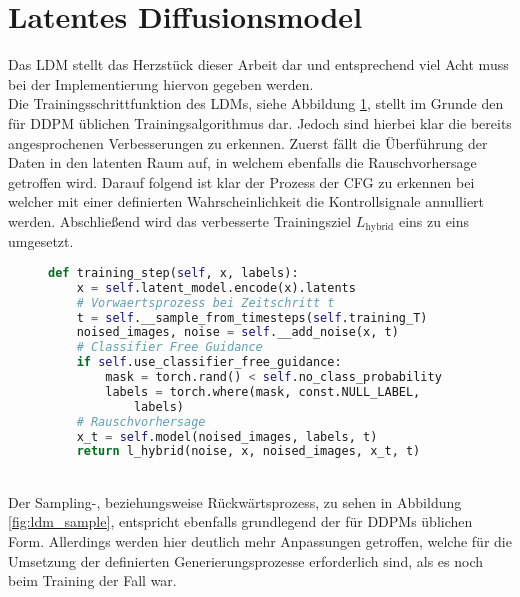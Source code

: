 \section {Latentes Diffusionsmodel}

Das \ac{LDM} stellt das Herzstück dieser Arbeit dar und entsprechend viel Acht muss bei der Implementierung hiervon gegeben werden. \\ 
Die Trainingsschrittfunktion des \ac{LDM}s, siehe Abbildung \ref{fig:ldm_training}, stellt im Grunde den für \ac{DDPM} üblichen Trainingsalgorithmus dar. Jedoch sind hierbei klar die bereits angesprochenen Verbesserungen zu erkennen. Zuerst fällt die Überführung der Daten in den latenten Raum auf, in welchem ebenfalls die Rauschvorhersage getroffen wird. Darauf folgend ist klar der Prozess der \ac{CFG} zu erkennen bei welcher mit einer definierten Wahrscheinlichkeit die Kontrollsignale annulliert werden. Abschließend wird das verbesserte Trainingsziel $L_\text{hybrid}$ eins zu eins umgesetzt.
\begin{figure}[htbp]
\begin{lstlisting}[language=python]
def training_step(self, x, labels):
    x = self.latent_model.encode(x).latents
    # Vorwaertsprozess bei Zeitschritt t
    t = self.__sample_from_timesteps(self.training_T)
    noised_images, noise = self.__add_noise(x, t)
    # Classifier Free Guidance
    if self.use_classifier_free_guidance: 
        mask = torch.rand() < self.no_class_probability
        labels = torch.where(mask, const.NULL_LABEL, 
            labels)   
    # Rauschvorhersage
    x_t = self.model(noised_images, labels, t)
    return l_hybrid(noise, x, noised_images, x_t, t)
\end{lstlisting}
    \captionsetup{type=figure}
    \label{fig:ldm_training}
\end{figure} \\
Der Sampling-, beziehungsweise Rückwärtsprozess, zu sehen in Abbildung \ref{fig:ldm_sample}, entspricht ebenfalls grundlegend der für \ac{DDPM}s üblichen Form. Allerdings werden hier deutlich mehr Anpassungen getroffen, welche für die Umsetzung der definierten Generierungsprozesse erforderlich sind, als es noch beim Training der Fall war. \\

